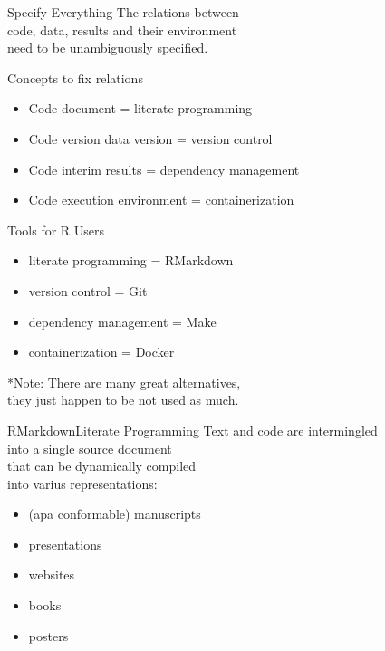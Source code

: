 \documentclass[12pt,t]{beamer}
\begin{document}
{\begin{frame}[c]{Specify Everything}
  \textcolor<3->{lolit}{The relations between\\
  \textcolor<2>{hilit}{code}, \textcolor<2>{hilit}{data}, \textcolor<2>{hilit}{results} and their \textcolor<2>{hilit}{environment}\\
  need to be \textcolor<2>{vhilit}{unambiguously} specified.\\}
  \vspace{10mm}
\end{frame}

\begin{frame}[c]{Concepts to fix relations}
  \begin{itemize}
    \item Code \textemdash{} document = literate programming
    \item Code version \textemdash{} data version = version control
    \item Code \textemdash{} interim results = dependency management
    \item Code \textemdash{} execution environment = containerization
  \end{itemize}
\end{frame}

\begin{frame}[c]{Tools for R Users}
  \begin{itemize}
    \item literate programming = RMarkdown
    \item version control = Git
    \item dependency management = Make
    \item containerization = Docker
  \end{itemize}
  \vfill
  \textcolor{lolit}{*Note: There are many great alternatives,\\they just happen to be not used as much.}
\end{frame}

\begin{frame}[c]{RMarkdown\textemdash{}Literate Programming}
  Text and code are intermingled\\
  into a single source document\\
  that can be dynamically compiled\\
  into varius representations:
  \begin{itemize}
    \item (apa conformable) manuscripts
    \item presentations
    \item websites
    \item books
    \item posters
  \end{itemize}
\end{frame}

}
\end{document}
